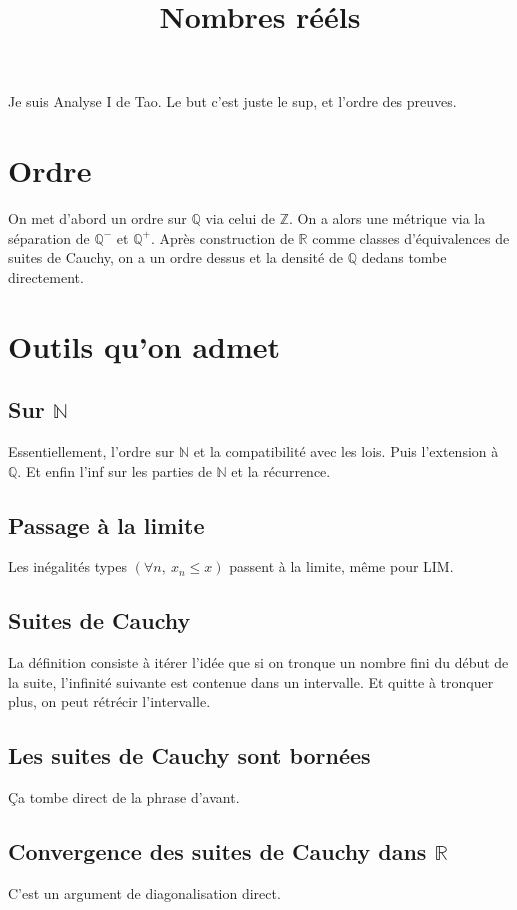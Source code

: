 \documentclass[a4paper,12pt]{book}
\title{Nombres rééls}
\date{}
\newcommand{\Z}{\mathbb{Z}}
\newcommand{\R}{\mathbb{R}}
\newcommand{\Q}{\mathbb{Q}}
\newcommand{\N}{\mathbb{N}}
\theoremstyle{plain}
\theoremstyle{definition}
\theoremstyle{remark}
\begin{document}
\maketitle
Je suis Analyse I de Tao. Le but c'est juste le sup, et l'ordre des preuves.

\section{Ordre}
On met d'abord un ordre sur $\Q$ via celui de $\Z$. On a alors une métrique via la
séparation de $\Q^-$ et $\Q^+$. Après construction de $\R$ comme classes d'équivalences
de suites de Cauchy, on a un ordre dessus et la densité de $\Q$ dedans tombe 
directement. 

\section{Outils qu'on admet}
\subsection{Sur $\N$}
Essentiellement, l'ordre sur $\N$ et la compatibilité avec les lois. Puis l'extension
à $\Q$. Et enfin l'inf sur les parties de $\N$ et la récurrence.

\subsection{Passage à la limite}
Les inégalités types $(\forall n,~x_n\leq x)$ passent à la limite, même pour LIM.

\subsection{Suites de Cauchy}
La définition consiste à itérer l'idée que si on tronque un nombre fini du début
de la suite, l'infinité suivante est contenue dans un intervalle. Et quitte 
à tronquer plus, on peut rétrécir l'intervalle.

\subsection{Les suites de Cauchy sont bornées}
Ça tombe direct de la phrase d'avant.

\subsection{Convergence des suites de Cauchy dans $\R$}
C'est un argument de diagonalisation direct.
\end{document}
